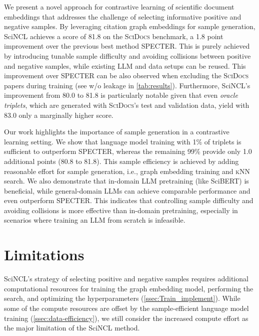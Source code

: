 \documentclass[11pt]{article}
\newcommand{\dataset}{\textsc{SciDocs}\xspace}
\newcommand{\knn}{\textsc{kNN}\xspace}
\newcommand{\sys}{SciNCL\xspace} \newcommand{\baselineCount}{10\xspace}
\begin{document}
We present a novel approach for contrastive learning of scientific document embeddings that addresses the challenge of selecting informative positive and negative samples.
By leveraging citation graph embeddings for sample generation, \sys achieves a score of 81.8 on the \dataset benchmark, a 1.8 point improvement over the previous best method SPECTER.
This is purely achieved by introducing tunable sample difficulty and avoiding collisions between positive and negative samples, while existing LLM and data setups can be reused. 
This improvement over SPECTER can be also observed when excluding the \dataset papers during training (see w/o leakage in \cref{tab:results}). 
Furthermore, \sys's improvement from 80.0 to 81.8 is particularly notable given that even \textit{oracle triplets}, which are generated with \dataset's test and validation data, yield with 83.0 only a marginally higher score. 

Our work highlights the importance of sample generation in a contrastive learning setting.
We show that language model training with 1\% of triplets is sufficient to outperform SPECTER, whereas the remaining 99\% provide only 1.0 additional points (80.8 to 81.8).
This sample efficiency is achieved by adding reasonable effort for sample generation, i.e., graph embedding training and \knn
search. 
We also demonstrate that in-domain LLM pretraining (like SciBERT) is beneficial, while general-domain LLMs can achieve comparable performance and even outperform SPECTER.
This indicates that controlling sample difficulty and avoiding collisions
is more effective than in-domain pretraining, especially in scenarios where training an LLM from scratch is infeasible.












\section{Limitations}

\sys's strategy of selecting positive and negative samples requires additional computational resources for training the graph embedding model, performing the  search, and optimizing the hyperparameters  (\cref{ssec:Train_implement}). While some of the compute resources are offset by the sample-efficient language model training (\cref{ssec:data-efficiency}), we  still consider the increased compute effort as the major limitation of the \sys method.
\end{document}
